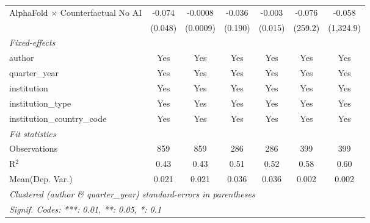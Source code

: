 \begin{tabular}{lcccccc}
   AlphaFold $\times$ Counterfactual No AI  & -0.074  & -0.0008  & -0.036  & -0.003  & -0.076  & -0.058\\   
                                            & (0.048) & (0.0009) & (0.190) & (0.015) & (259.2) & (1,324.9)\\   
   \midrule
   \emph{Fixed-effects}\\
   author                                   & Yes     & Yes      & Yes     & Yes     & Yes     & Yes\\  
   quarter\_year                            & Yes     & Yes      & Yes     & Yes     & Yes     & Yes\\  
   institution                              & Yes     & Yes      & Yes     & Yes     & Yes     & Yes\\  
   institution\_type                        & Yes     & Yes      & Yes     & Yes     & Yes     & Yes\\  
   institution\_country\_code               & Yes     & Yes      & Yes     & Yes     & Yes     & Yes\\  
   \midrule
   \emph{Fit statistics}\\
   Observations                             & 859     & 859      & 286     & 286     & 399     & 399\\  
   R$^2$                                    & 0.43    & 0.43     & 0.51    & 0.52    & 0.58    & 0.60\\  
Mean(Dep. Var.) & 0.021 & 0.021 & 0.036 & 0.036 & 0.002 & 0.002 \\
   \midrule \midrule
   \multicolumn{7}{l}{\emph{Clustered (author \& quarter\_year) standard-errors in parentheses}}\\
   \multicolumn{7}{l}{\emph{Signif. Codes: ***: 0.01, **: 0.05, *: 0.1}}\\
\end{tabular}
\par\endgroup
